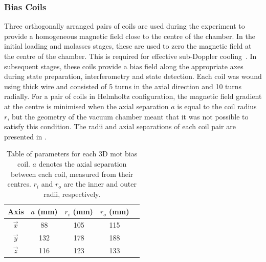 \subsubsection{Bias Coils}
Three orthogonally arranged pairs of coils are used during the
experiment to provide a homogeneous magnetic field close to the centre of the chamber. In the initial loading and molasses stages, these are used to zero the magnetic field at the centre of the chamber. This is required for effective sub-Doppler cooling~\nocite{Walhout1992}. In subsequent stages,
these coils provide a bias field along the appropriate axes during state
preparation, interferometry and state detection. Each coil was wound using
 thick wire and consisted of 5 turns in the
axial direction and 10 turns radially. For a pair of coils in Helmholtz configuration, the magnetic field
gradient at the centre is minimised when the axial separation \(a\) is equal to
the coil radius \(r\), but the geometry of the vacuum chamber meant that it was
not possible to satisfy this condition. The radii and axial separations of each
coil pair are presented in .\begin{table}
	\begin{tabular}{ccccc}
		\toprule
		Axis        & \(a\) (mm) & \(r_i\) (mm) & \(r_o\) (mm) \\
		\midrule
		\(\vec{x}\) & 88         & 105          & 115          \\
		\(\vec{y}\) & 132        & 178          & 188          \\
		\(\vec{z}\) & 116        & 123          & 133          \\
		\bottomrule
	\end{tabular}
	\caption[Table of parameters for each 3D \ac{mot} bias coil.]{Table of
		parameters for each 3D \ac{mot} bias coil. \(a\) denotes the axial
		separation between each coil, measured from their centres. \(r_i\) and \(r_o\) are the inner and
		outer radii, respectively.}
	\label{tab:bias_coils}
\end{table}
